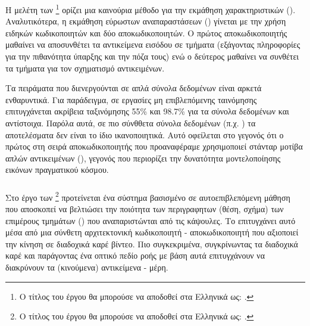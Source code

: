 \subsubsection{}

Η μελέτη των  \footnote{Ο τίτλος του έργου θα μπορούσε να αποδοθεί στα Ελληνικά ως: .} \cite{kosiorek2019stacked} ορίζει μια καινούρια μέθοδο για την εκμάθηση χαρακτηριστικών (). Αναλυτικότερα, η εκμάθηση εύρωστων αναπαραστάσεων () γίνεται με την χρήση ειδηκών κωδικοποιητών και δύο αποκωδικοποιητών. Ο πρώτος αποκωδικοποιητής μαθαίνει να αποσυνθέτει τα αντικείμενα εισόδου σε τμήματα (εξάγοντας πληροφορίες για την πιθανότητα ύπαρξης και την πόζα τους) ενώ ο δεύτερος μαθαίνει να συνθέτει τα τμήματα για τον σχηματισμό αντικειμένων.\par

Τα πειράματα που διενεργούνται σε απλά σύνολα δεδομένων είναι αρκετά ενθαρυντικά. Για παράδειγμα, σε εργασίες μη επιβλεπόμενης ταινόμησης επιτυγχάνεται ακρίβεια ταξινόμησης 55\% και 98.7\% για τα σύνολα δεδομένων  και  αντίστοιχα. Παρόλα αυτά, σε πιο σύνθθετα σύνολα δεδομένων (π.χ. ) τα αποτελέσματα δεν είναι το ίδιο ικανοποιητικά. Αυτό οφείλεται στο γεγονός ότι ο πρώτος στη σειρά αποκωδικοποιητής που προαναφέραμε χρησιμοποιεί στάνταρ μοτίβα απλών αντικειμένων (), γεγονός που περιορίζει την δυνατότητα μοντελοποίησης εικόνων πραγματικού κόσμου.

\subsubsection{}

Στο έργο των  \footnote{Ο τίτλος του έργου θα μπορούσε να αποδοθεί στα Ελληνικά ως: .} \cite{pmlr-v139-sabour21a} προτείνεται ένα σύστημα βασισμένο σε αυτο\textendash επιβλεπόμενη μάθηση που αποσκοπεί να βελτιώσει την ποιότητα των περιγραφητων (θέση, σχήμα) των επιμέρους τμημάτων () που αναπαριστώνται από τις κάψουλες. Το επιτυγχάνει αυτό μέσα από μια σύνθετη αρχιτεκτονική κωδικοποιητή - αποκωδικοποιητή που αξιοποιεί την κίνηση σε διαδοχικά καρέ βίντεο. Πιο συγκεκριμένα, συγκρίνωντας τα διαδοχικά καρέ και παράγοντας ένα οπτικό πεδίο ροής με βάση αυτά επιτυγχάνουν να διακρύνουν τα (κινούμενα) αντικείμενα - μέρη.\par 

